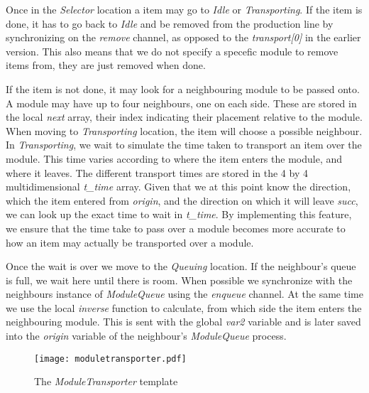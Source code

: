 Once in the \emph{Selector} location a item may go to \emph{Idle} or \emph{Transporting}. If the item is done, it has to go back to \textit{Idle} and be removed from the production line by synchronizing on the \emph{remove} channel, as opposed to the \emph{transport[0]} in the earlier version. This also means that we do not specify a specefic module to remove items from, they are just removed when done.

If the item is not done, it may look for a neighbouring module to be passed onto. A module may have up to four neighbours, one on each side. These are stored in the local \emph{next} array, their index indicating their placement relative to the module. When moving to \emph{Transporting} location, the item will choose a possible neighbour. In \emph{Transporting}, we wait to simulate the time taken to transport an item over the module. This time varies according to where the item enters the module, and where it leaves. The different transport times are stored in the 4 by 4 multidimensional \emph{t\_time} array. Given that we at this point know the direction, which the item entered from \emph{origin}, and the direction on which it will leave \emph{succ}, we can look up the exact time to wait in \emph{t\_time}. By implementing this feature, we ensure that the time take to pass over a module becomes more accurate to how an item may actually be transported over a module. 

Once the wait is over we move to the \emph{Queuing} location. If the neighbour's queue is full, we wait here until there is room. When possible we synchronize with the neighbours instance of \emph{ModuleQueue} using the \emph{enqueue} channel. At the same time we use the local \emph{inverse} function to calculate, from which side the item enters the neighbouring module. This is sent with the global \emph{var2} variable and is later saved into the  \emph{origin} variable of the neighbour's \textit{ModuleQueue} process. 

\begin{figure}[h]
\centering
\texttt{[image: moduletransporter.pdf]}
\caption{The \textit{ModuleTransporter} template}
\label{fig:moduletransporter}
\end{figure}


